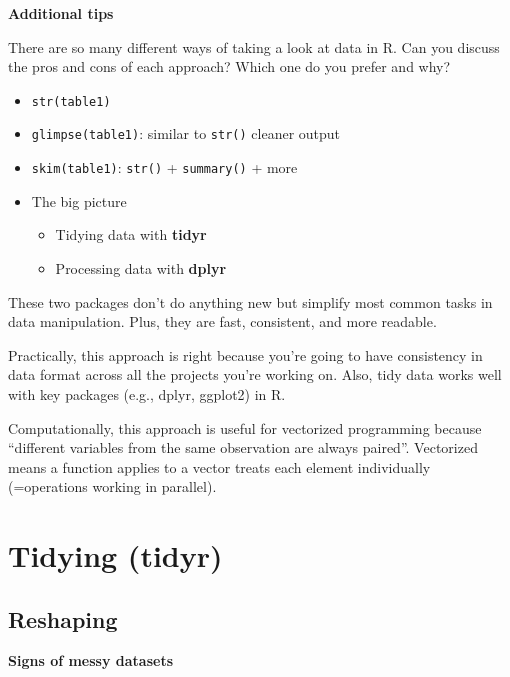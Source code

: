 \documentclass[
]{book}
\providecommand{\tightlist}{%
  \setlength{\itemsep}{0pt}\setlength{\parskip}{0pt}}
\begin{document}
\textbf{Additional tips}

There are so many different ways of taking a look at data in R. Can you discuss the pros and cons of each approach? Which one do you prefer and why?

\begin{itemize}
\item
  \texttt{str(table1)}
\item
  \texttt{glimpse(table1)}: similar to \texttt{str()} cleaner output
\item
  \texttt{skim(table1)}: \texttt{str()} + \texttt{summary()} + more
\item
  The big picture

  \begin{itemize}
  \tightlist
  \item
    Tidying data with \textbf{tidyr}
  \item
    Processing data with \textbf{dplyr}
  \end{itemize}
\end{itemize}

These two packages don't do anything new but simplify most common tasks in data manipulation. Plus, they are fast, consistent, and more readable.

Practically, this approach is right because you're going to have consistency in data format across all the projects you're working on. Also, tidy data works well with key packages (e.g., dplyr, ggplot2) in R.

Computationally, this approach is useful for vectorized programming because ``different variables from the same observation are always paired''. Vectorized means a function applies to a vector treats each element individually (=operations working in parallel).

\hypertarget{tidying-tidyr}{%
\section{Tidying (tidyr)}\label{tidying-tidyr}}

\hypertarget{reshaping}{%
\subsection{Reshaping}\label{reshaping}}

\textbf{Signs of messy datasets}
\end{document}
